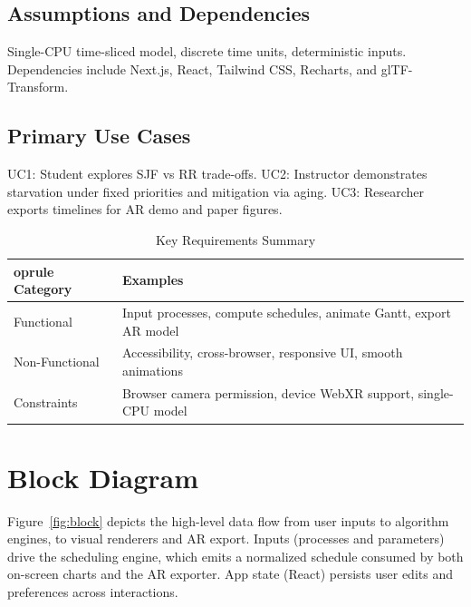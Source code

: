 \documentclass[12pt,a4paper,oneside]{report}
\begin{document}
\subsection*{Assumptions and Dependencies}
Single-CPU time-sliced model, discrete time units, deterministic inputs. Dependencies include Next.js, React, Tailwind CSS, Recharts, and glTF-Transform.

\subsection*{Primary Use Cases}
UC1: Student explores SJF vs RR trade-offs. UC2: Instructor demonstrates starvation under fixed priorities and mitigation via aging. UC3: Researcher exports timelines for AR demo and paper figures.

\begin{table}[H]
  \centering
  \caption{Key Requirements Summary}
  \begin{tabular}{p{} p{}}
  	oprule
    Category & Examples \\
    \midrule
    Functional & Input processes, compute schedules, animate Gantt, export AR model \\
    Non-Functional & Accessibility, cross-browser, responsive UI, smooth animations \\
    Constraints & Browser camera permission, device WebXR support, single-CPU model \\
    \bottomrule
  \end{tabular}
\end{table}

\section{Block Diagram}
Figure~\ref{fig:block} depicts the high-level data flow from user inputs to algorithm engines, to visual renderers and AR export. Inputs (processes and parameters) drive the scheduling engine, which emits a normalized schedule consumed by both on-screen charts and the AR exporter. App state (React) persists user edits and preferences across interactions.
\end{document}
